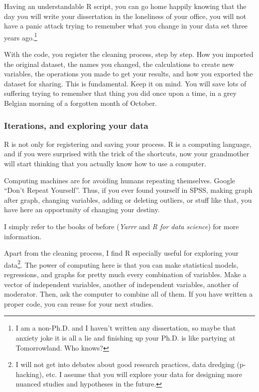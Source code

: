 \documentclass{article}
\begin{document}
Having an understandable R script, you can go home happily knowing that the day you will write your dissertation in the loneliness of your office, you will not have a panic attack trying to remember what you change in your data set three years ago.\footnote{I am a non-Ph.D. and I haven’t written any dissertation, so maybe that anxiety joke it is all a lie and finishing up your Ph.D. is like partying at Tomorrowland. Who knows?} 

With the code, you register the cleaning process, step by step. How you imported the original dataset, the names you changed, the calculations to create new variables, the operations you made to get your results, and how you exported the dataset for sharing. This is fundamental. Keep it on mind. You will save lots of suffering trying to remember that thing you did once upon a time, in a grey Belgian morning of a forgotten month of October.

\subsubsection{Iterations, and exploring your data}
\label{subsubsec: iterations}
R is not only for registering and saving your process. R is a computing language, and if you were surprised with the trick of the shortcuts, now your grandmother will start thinking that you actually know how to use a computer.

Computing machines are for avoiding humans repeating themselves. Google “Don’t Repeat Yourself”. Thus, if you ever found yourself in SPSS, making graph after graph, changing variables, adding or deleting outliers, or stuff like that, you have here an opportunity of changing your destiny.

I simply refer to the books of before (\emph{Yarrr} and \emph{R for data science}) for more information.

Apart from the cleaning process, I find R especially useful for exploring your data\footnote{  I will not get into debates about good research practices, data dredging (p-hacking), etc. I assume that you will explore your data for designing more nuanced studies and hypotheses in the future.}.  The power of computing here is that you can make statistical models, regressions, and graphs for pretty much every combination of variables. Make a vector of independent variables, another of independent variables, another of moderator. Then, ask the computer to combine all of them. If you have written a proper code, you can reuse for your next studies.
\end{document}
